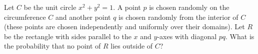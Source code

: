 Let $C$ be the unit circle $x^2+y^2=1$. A point $p$ is chosen randomly
on the circumference $C$ and another point $q$ is chosen randomly from
the interior of $C$ (these points are chosen independently and
uniformly over their domains). Let $R$ be the rectangle with sides
parallel to the $x$ and $y$-axes with diagonal $pq$. What is the
probability that no point of $R$ lies outside of $C$?
